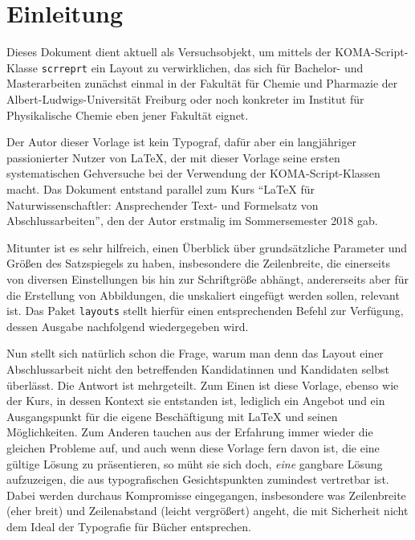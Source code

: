 %
%
%

\chapter{Einleitung}

Dieses Dokument dient aktuell als Versuchsobjekt, um mittels der KOMA-Script-Klasse \texttt{scrreprt} ein Layout zu verwirklichen, das sich für Bachelor- und Masterarbeiten zunächst einmal in der Fakultät für Chemie und Pharmazie der Albert-Ludwigs-Universität Freiburg oder noch konkreter im Institut für Physikalische Chemie eben jener Fakultät eignet.

Der Autor dieser Vorlage ist kein Typograf, dafür aber ein langjähriger passionierter Nutzer von \LaTeX{}, der mit dieser Vorlage seine ersten systematischen Gehversuche bei der Verwendung der KOMA-Script-Klassen macht. Das Dokument entstand parallel zum Kurs \enquote{\LaTeX{} für Naturwissenschaftler: Ansprechender Text- und Formelsatz von Abschlussarbeiten}, den der Autor erstmalig im Sommersemester 2018 gab.

Mitunter ist es sehr hilfreich, einen Überblick über grundsätzliche Parameter und Größen des Satzspiegels zu haben, insbesondere die Zeilenbreite, die einerseits von diversen Einstellungen bis hin zur Schriftgröße abhängt, andererseits aber für die Erstellung von Abbildungen, die unskaliert eingefügt werden sollen, relevant ist. Das Paket \texttt{layouts} stellt hierfür einen entsprechenden Befehl zur Verfügung, dessen Ausgabe nachfolgend wiedergegeben wird.

\begin{center}
\paragraphvalues
\end{center}

Nun stellt sich natürlich schon die Frage, warum man denn das Layout einer Abschlussarbeit nicht den betreffenden Kandidatinnen und Kandidaten selbst überlässt. Die Antwort ist mehrgeteilt. Zum Einen ist diese Vorlage, ebenso wie der Kurs, in dessen Kontext sie entstanden ist, lediglich ein Angebot und ein Ausgangspunkt für die eigene Beschäftigung mit \LaTeX{} und seinen Möglichkeiten. Zum Anderen tauchen aus der Erfahrung immer wieder die gleichen Probleme auf, und auch wenn diese Vorlage fern davon ist, die eine gültige Lösung zu präsentieren, so müht sie sich doch, \emph{eine} gangbare Lösung aufzuzeigen, die aus typografischen Gesichtspunkten zumindest vertretbar ist. Dabei werden durchaus Kompromisse eingegangen, insbesondere was Zeilenbreite (eher breit) und Zeilenabstand (leicht vergrößert) angeht, die mit Sicherheit nicht dem Ideal der Typografie für Bücher entsprechen.

